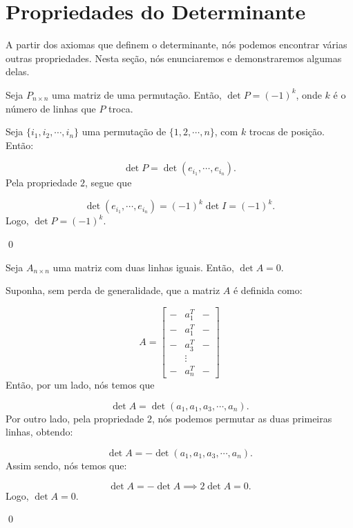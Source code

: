 \section{Propriedades do Determinante}

A partir dos axiomas que definem o determinante, nós podemos encontrar várias outras propriedades. Nesta seção, nós enunciaremos e demonstraremos algumas delas.

\begin{Proposition}
	Seja $P_{n\times n}$ uma matriz de uma permutação. Então, $\det P = (-1)^k$, onde $k$ é o número de linhas que $P$ troca.
\end{Proposition}

\begin{Proof}
	Seja $\{i_1, i_2, \cdots, i_n\}$ uma permutação de $\{1, 2, \cdots, n\}$, com $k$ trocas de posição. Então:
	
	$$
	\det P = \det(e_{i_1}, \cdots, e_{i_n}).
	$$
	Pela propriedade $2$, segue que
	
	$$
	\det(e_{i_1}, \cdots, e_{i_n}) = (-1)^k\det I = (-1)^k.
	$$
	Logo, $\det P = (-1)^k$.
	
	\qed
\end{Proof}

\begin{Proposition}
	Seja $A_{n\times n}$ uma matriz com duas linhas iguais. Então, $\det A = 0$.
\end{Proposition}

\begin{Proof}
	Suponha, sem perda de generalidade, que a matriz $A$ é definida como:
	
	$$
	A = \begin{bmatrix}
		- & a_1^T & - \\
		- & a_1^T & - \\
		- & a_3^T & - \\
		& \vdots & \\
		- & a_n^T & -
	\end{bmatrix}
	$$
	Então, por um lado, nós temos que
	
	$$
	\det A = \det(a_1, a_1, a_3, \cdots, a_n).
	$$
	Por outro lado, pela propriedade $2$, nós podemos permutar as duas primeiras linhas, obtendo:
	
	$$
	\det A = -\det(a_1, a_1, a_3, \cdots, a_n).
	$$
	Assim sendo, nós temos que:
	
	$$
	\det A = -\det A\implies 2\det A = 0.
	$$
	Logo, $\det A = 0$.
	
	\qed
\end{Proof}

